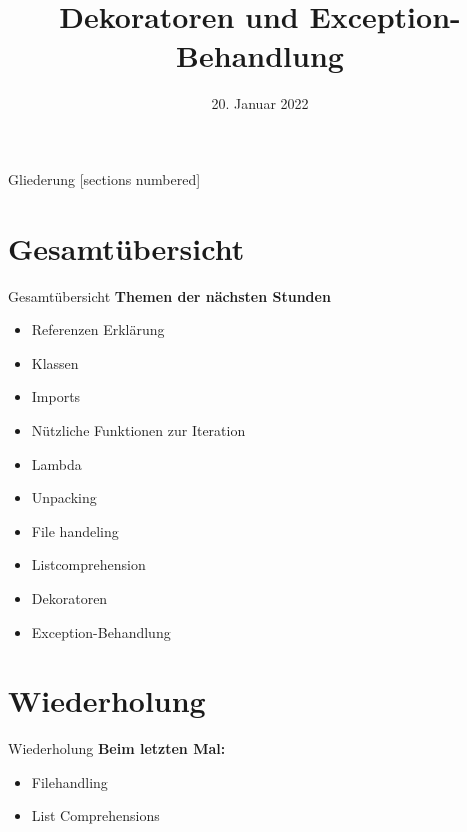 



\title{Dekoratoren und Exception-Behandlung}
\date{20. Januar 2022}


	
\maketitle

\begin{frame}{Gliederung}
	[sections numbered]
	\tableofcontents
\end{frame}

\section*{Gesamtübersicht}
\begin{frame}{Gesamtübersicht}
	\textbf{Themen der nächsten Stunden}
	\begin{itemize}
		\item Referenzen Erklärung
		\item  Klassen
		\item Imports
		\item Nützliche Funktionen zur Iteration
		\item Lambda
		\item Unpacking
		\item File handeling
		\item Listcomprehension
		\item \alert{Dekoratoren}
		\item \alert{Exception-Behandlung}
	\end{itemize}
\end{frame}

\section{Wiederholung}
\begin{frame}{Wiederholung}
	\textbf{Beim letzten Mal:}
	\begin{itemize}
		\item Filehandling
		
		\item List Comprehensions
		
	\end{itemize}	
\end{frame}

